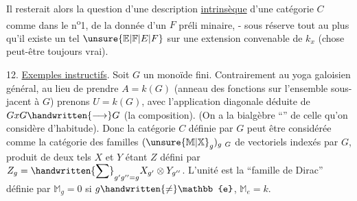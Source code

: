 
Il resterait alors la question d'une description \uline{intrinsèque} d'une catégorie $C$ comme dans le n\textsuperscript{o}1,  de la donnée d'un $F$ préli%
%
minaire, - sous réserve tout au plus qu'il existe un tel $\unsure{\mathbb{E}|\mathbb{F}|E|F}$ sur une extension convenable de $k_x$ (chose peut-être toujours vrai).

12. \uline{Exemples instructifs}. Soit $G$ un monoïde fini. Contrairement au yoga galoisien général, au lieu de prendre $A=k(G)$ (anneau des fonctions sur l'ensemble sous-jacent à $G$) prenons $U=k(G)$, avec l'application diagonale déduite de $GxG\handwritten{\longrightarrow}G$ (la composition). (On a la bialgèbre ``'' de celle qu'on considère d'habitude). Donc la catégorie $C$ définie par $G$  peut être considérée comme la catégorie des familles $(\unsure{\mathbb{M}|\mathbb{X}}_g)_{g\ G}$ de vectoriels indexés par $G$,  produit de deux tels $X$ et $Y$ étant $Z$ défini par $Z_g=\handwritten{\displaystyle\sum}_{g'g''=g}X_{g'}\otimes Y_{g''}$. L'unité est la ``famille de Dirac'' définie par $\mathbb{M}_g=0$ si $g\handwritten{\ne}\mathbb{e}$, $\mathbb{M}_e=k$.

